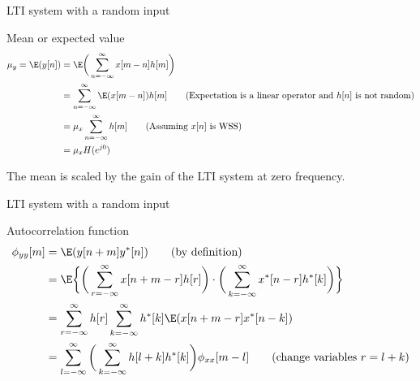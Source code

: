 \documentclass[10pt, aspectratio=169]{beamer}
\begin{document}
%
\begin{frame}{LTI system with a random input}

\begin{block}{Mean or expected value}
	\begin{align*}
	\mu_y = \E(y[n]) &= \E\bigg(\sum_{n=-\infty}^{\infty} x[m-n]h[m]\bigg) \\
	&= \sum_{n=-\infty}^{\infty} \E(x[m-n])h[m] \tag{Expectation is a linear operator and $h[n]$ is not random} \\
	&= \mu_x\sum_{n=-\infty}^{\infty} h[m] \tag{Assuming $x[n]$ is WSS} \\
	&= \mu_xH(e^{j0})
	\end{align*}
\end{block}

The mean is scaled by the gain of the LTI system at zero frequency.
\end{frame}

\begin{frame}{LTI system with a random input}

\begin{block}{Autocorrelation function}
	\begin{align} \nonumber
	\phi_{yy}[m] &= \E(y[n+m]y^*[n]) \tag{by definition}  \\ \nonumber
	&= \E\bigg\lbrace\bigg(\sum_{r=-\infty}^{\infty} x[n+m-r]h[r]\bigg)\cdot\bigg(\sum_{k=-\infty}^{\infty} x^*[n-r]h^*[k]\bigg)\bigg\rbrace  \\ \nonumber
	&= \sum_{r=-\infty}^{\infty} h[r] \sum_{k=-\infty}^{\infty} h^*[k]\E(x[n+m-r]x^*[n-k]) \\
	&= \sum_{l=-\infty}^{\infty} \bigg(\sum_{k=-\infty}^{\infty} h[l+k]h^*[k]\bigg)\phi_{xx}[m-l] \tag{change variables $r = l+k$}
	\end{align}
\end{block}
\end{frame}
\end{document}

